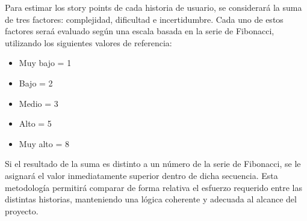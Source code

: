 \documentclass[
11pt, %
]{charter}
\begin{document}
Para estimar los story points de cada historia de usuario, se considerará la suma de tres factores: complejidad, dificultad e incertidumbre. Cada uno de estos factores seraá evaluado según una escala basada en la serie de Fibonacci, utilizando los siguientes valores de referencia:

\begin{itemize}
	\item Muy bajo = 1
	\item Bajo = 2
	\item Medio = 3
	\item Alto = 5
	\item Muy alto = 8

\end{itemize}

Si el resultado de la suma es distinto a un número de la serie de Fibonacci, se le asignará el valor inmediatamente superior dentro de dicha secuencia. Esta metodología permitirá comparar de forma relativa el esfuerzo requerido entre las distintas historias, manteniendo una lógica coherente y adecuada al alcance del proyecto.
\end{document}
